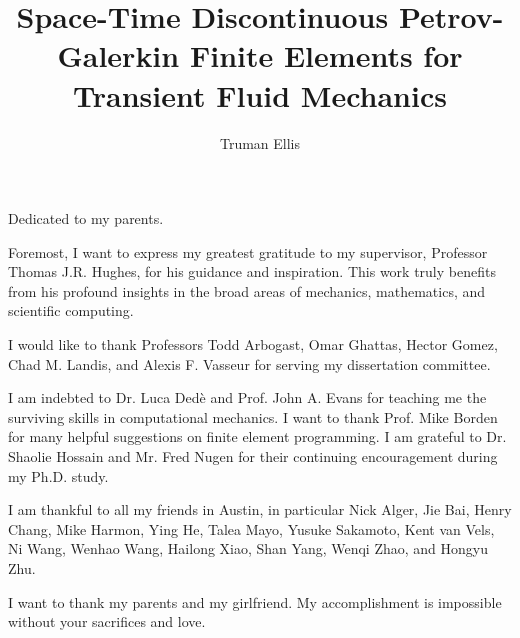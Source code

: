 \documentclass[12pt]{report} %
\author{Truman Ellis}  	%
\title{Space-Time Discontinuous Petrov-Galerkin Finite Elements for Transient Fluid Mechanics}
\begin{document}
\copyrightpage          %


%
%
%
\commcertpage           %

\titlepage  %



%
\begin{dedication}
%
Dedicated to my parents.
\end{dedication}


\begin{acknowledgments}		%
%
Foremost, I want to express my greatest gratitude to my supervisor, Professor Thomas J.R. Hughes, for his guidance and inspiration. This work truly benefits from his profound insights in the broad areas of mechanics, mathematics, and scientific computing. 

I would like to thank Professors Todd Arbogast, Omar Ghattas, Hector Gomez, Chad M. Landis, and Alexis F. Vasseur for serving my dissertation committee.

I am indebted to Dr. Luca Ded\`e and Prof. John A. Evans for teaching me the surviving skills in computational mechanics. I want to thank Prof. Mike Borden for many helpful suggestions on finite element programming. I am grateful to Dr. Shaolie Hossain and Mr. Fred Nugen for their continuing encouragement during my Ph.D. study.

I am thankful to all my friends in Austin, in particular Nick Alger, Jie Bai, Henry Chang, Mike Harmon, Ying He, Talea Mayo, Yusuke Sakamoto, Kent van Vels, Ni Wang, Wenhao Wang, Hailong Xiao, Shan Yang, Wenqi Zhao, and Hongyu Zhu.

I want to thank my parents and my girlfriend. My accomplishment is impossible without your sacrifices and love. 

\end{acknowledgments}
\end{document}
